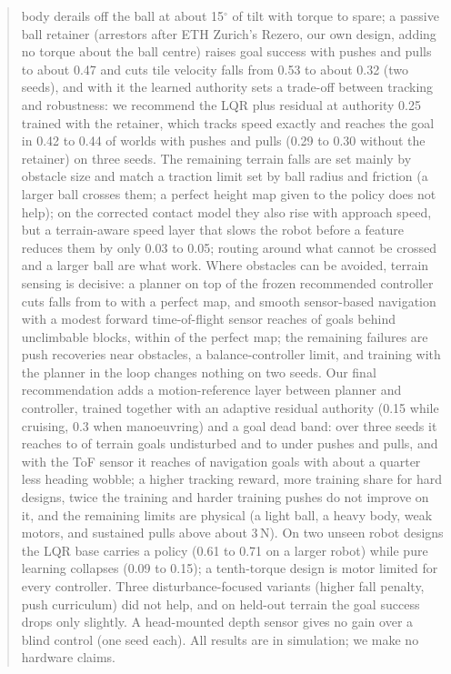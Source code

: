 \documentclass[conference]{IEEEtran}
\theoremstyle{remark}
\begin{document}
\begin{abstract}
body derails off the ball at about 15$^\circ$ of tilt with torque to spare; a passive ball retainer (arrestors after ETH Zurich's Rezero, our own design, adding no torque about the ball centre) raises goal success with pushes and pulls to about 0.47 and cuts tile velocity falls from 0.53 to about 0.32 (two seeds), and with it the learned authority sets a trade-off between tracking and robustness: we recommend the LQR plus residual at authority 0.25 trained with the retainer, which tracks speed exactly and reaches the goal in 0.42 to 0.44 of worlds with pushes and pulls (0.29 to 0.30 without the retainer) on three seeds. The remaining terrain falls are set mainly by obstacle size and match a traction limit set by ball radius and friction (a larger ball crosses them; a perfect height map given to the policy does not help); on the corrected contact model they also rise with approach speed, but a terrain-aware speed layer that slows the robot before a feature reduces them by only 0.03 to 0.05; routing around what cannot be crossed and a larger ball are what work. Where obstacles can be avoided, terrain sensing is decisive: a planner on top of the frozen recommended controller cuts falls from  to  with a perfect map, and smooth sensor-based navigation with a modest forward time-of-flight sensor reaches  of goals behind unclimbable blocks, within  of the perfect map; the remaining failures are push recoveries near obstacles, a balance-controller limit, and training with the planner in the loop changes nothing on two seeds. Our final recommendation adds a motion-reference layer between planner and controller, trained together with an adaptive residual authority (0.15 while cruising, 0.3 when manoeuvring) and a goal dead band: over three seeds it reaches  to  of terrain goals undisturbed and  to  under pushes and pulls, and with the ToF sensor it reaches  of navigation goals with about a quarter less heading wobble; a higher tracking reward, more training share for hard designs, twice the training and harder training pushes do not improve on it, and the remaining limits are physical (a light ball, a heavy body, weak motors, and sustained pulls above about 3\,N). On two unseen robot designs the LQR base carries a policy (0.61 to 0.71 on a larger robot) while pure learning collapses (0.09 to 0.15); a tenth-torque design is motor limited for every controller. Three disturbance-focused variants (higher fall penalty, push curriculum) did not help, and on held-out terrain the goal success drops only slightly. A head-mounted depth sensor gives no gain over a blind control (one seed each). All results are in simulation; we make no hardware claims.
\end{abstract}
\end{document}
